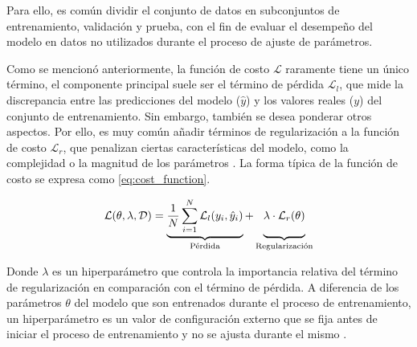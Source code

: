 Para ello, es común dividir el conjunto de datos en subconjuntos de entrenamiento, validación y prueba, con el fin de evaluar el desempeño del modelo en datos no utilizados durante el proceso de ajuste de parámetros.

Como se mencionó anteriormente, la función de costo $\mathcal{L}$ raramente tiene un único término, el componente principal suele ser el término de pérdida $\mathcal{L}_{l}$, que mide la discrepancia entre las predicciones del modelo ($\hat{y}$) y los valores reales ($y$) del conjunto de entrenamiento. Sin embargo, también se desea ponderar otros aspectos. Por ello, es muy común añadir términos de regularización a la función de costo $\mathcal{L}_{r}$, que penalizan ciertas características del modelo, como la complejidad o la magnitud de los parámetros \cite{Goodfellow2016}. La forma típica de la función de costo se expresa como \eqref{eq:cost_function}.

\begin{equation}
\label{eq:cost_function}
\mathcal{L}(\theta, \lambda, \mathcal{D}) =
    \underbrace{%
        \frac{1}{N} \sum_{i=1}^{N} \mathcal{L}_{l}(y_i, \hat{y}_i)
    }_{\text{Pérdida}}
    +
    \underbrace{%
        \lambda \cdot \mathcal{L}_{r}(\theta)\vphantom{\frac{1}{N} \sum_{i=1}^{N} \mathcal{L}_{l}(y_i, \hat{y}_i)}
    }_{\text{Regularización}}
\end{equation}

Donde $\lambda$ es un hiperparámetro que controla la importancia relativa del término de regularización en comparación con el término de pérdida. A diferencia de los parámetros $\theta$ del modelo que son entrenados durante el proceso de entrenamiento, un hiperparámetro es un valor de configuración externo que se fija antes de iniciar el proceso de entrenamiento y no se ajusta durante el mismo \cite{Goodfellow2016}.
